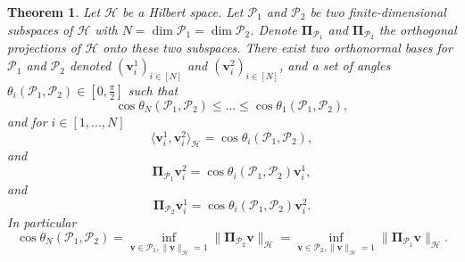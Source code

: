\documentclass[twoside,11pt]{book}
\newtheorem{theorem}{Theorem}
\numberwithin{theorem}{chapter}
\numberwithin{definition}{chapter}
\numberwithin{proposition}{chapter}
\numberwithin{corollary}{chapter}
\numberwithin{example}{chapter}
\numberwithin{lemma}{chapter}
\numberwithin{assumption}{chapter}
\numberwithin{equation}{chapter}
\numberwithin{figure}{chapter}
\begin{document}
\begin{theorem}\label{prop:cos_between_subspaces}
Let $\mathcal{H}$ be a Hilbert space. Let $\mathcal{P}_{1}$ and $\mathcal{P}_{2}$ be two finite-dimensional subspaces of $\mathcal{H}$ with $N = \dim \mathcal{P}_{1} = \dim \mathcal{P}_{2}$. Denote $\bm{\Pi}_{\mathcal{P}_{1}}$ and $\bm{\Pi}_{\mathcal{P}_{2}}$ the orthogonal projections of $\mathcal{H}$ onto these two subspaces. There exist two orthonormal bases for $\mathcal{P}_{1}$ and $\mathcal{P}_{2}$ denoted $(\bm{v}_{i}^{1})_{i \in [N]}$ and $(\bm{v}_{i}^{2})_{i \in [N]}$, and a set of angles $\theta_{i}(\mathcal{P}_{1},\mathcal{P}_{2}) \in [0,\frac{\pi}{2}]$ such that
\begin{equation}
\cos \theta_{N}(\mathcal{P}_{1},\mathcal{P}_{2}) \leq \dots \leq \cos \theta_{1}(\mathcal{P}_{1},\mathcal{P}_{2}) ,
\end{equation}
and for $i \in [1,...,N]$
\begin{equation}
\langle \bm{v}_{i}^{1}, \bm{v}_{i}^{2} \rangle_{\mathcal{H}} = \cos \theta_{i}(\mathcal{P}_{1},\mathcal{P}_{2}),
\end{equation}
and
\begin{equation}\label{eq:principal_vectors_projection_relationship}
 \bm{\Pi}_{\mathcal{P}_{1}}\bm{v}_{i}^{2} = \cos \theta_{i}(\mathcal{P}_{1},\mathcal{P}_{2}) \bm{v}_{i}^{1},
\end{equation}
and
\begin{equation}
 \bm{\Pi}_{\mathcal{P}_{2}}\bm{v}_{i}^{1} = \cos \theta_{i}(\mathcal{P}_{1},\mathcal{P}_{2}) \bm{v}_{i}^{2}.
\end{equation}
In particular
\begin{equation}\label{eq:costhetaN}
\cos \theta_{N}(\mathcal{P}_{1},\mathcal{P}_{2}) = \inf\limits_{\bm{v} \in \mathcal{P}_{1},\|\bm{v}\|_{\mathcal{H}} = 1} \|\bm{\Pi}_{\mathcal{P}_{2}}\bm{v}\|_{\mathcal{H}} = \inf\limits_{\bm{v} \in \mathcal{P}_{2},\|\bm{v}\|_{\mathcal{H}} = 1} \|\bm{\Pi}_{\mathcal{P}_{1}}\bm{v}\|_{\mathcal{H}}.
\end{equation}
\end{theorem}
\end{document}
